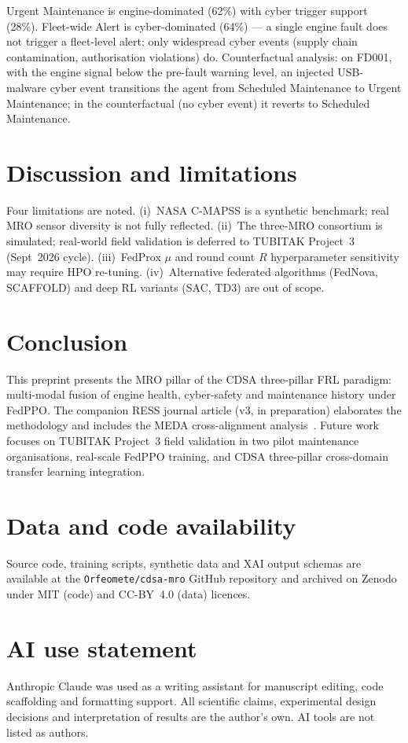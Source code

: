 \documentclass[11pt]{article}
\begin{document}
Urgent Maintenance is engine-dominated (62\%) with cyber trigger support (28\%). Fleet-wide Alert is cyber-dominated (64\%) --- a single engine fault does not trigger a fleet-level alert; only widespread cyber events (supply chain contamination, authorisation violations) do. Counterfactual analysis: on FD001, with the engine signal below the pre-fault warning level, an injected USB-malware cyber event transitions the agent from Scheduled Maintenance to Urgent Maintenance; in the counterfactual (no cyber event) it reverts to Scheduled Maintenance.

\section{Discussion and limitations}
Four limitations are noted. (i)~NASA C-MAPSS is a synthetic benchmark; real MRO sensor diversity is not fully reflected. (ii)~The three-MRO consortium is simulated; real-world field validation is deferred to TUBITAK Project~3 (Sept~2026 cycle). (iii)~FedProx $\mu$ and round count $R$ hyperparameter sensitivity may require HPO re-tuning. (iv)~Alternative federated algorithms (FedNova, SCAFFOLD) and deep RL variants (SAC, TD3) are out of scope.

\section{Conclusion}
This preprint presents the MRO pillar of the CDSA three-pillar FRL paradigm: multi-modal fusion of engine health, cyber-safety and maintenance history under FedPPO. The companion RESS journal article (v3, in preparation) elaborates the methodology and includes the MEDA cross-alignment analysis~\cite{meda, mitre, khan2024}. Future work focuses on TUBITAK Project~3 field validation in two pilot maintenance organisations, real-scale FedPPO training, and CDSA three-pillar cross-domain transfer learning integration.

\section*{Data and code availability}
Source code, training scripts, synthetic data and XAI output schemas are available at the \texttt{Orfeomete/cdsa-mro} GitHub repository and archived on Zenodo under MIT (code) and CC-BY~4.0 (data) licences.

\section*{AI use statement}
Anthropic Claude was used as a writing assistant for manuscript editing, code scaffolding and formatting support. All scientific claims, experimental design decisions and interpretation of results are the author's own. AI tools are not listed as authors.
\end{document}
